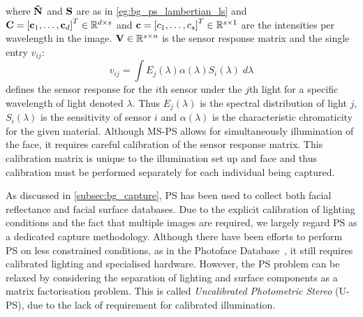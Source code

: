 where $\boldsymbol{\mathbf{\tilde{N}}}$ and $\boldsymbol{\mathbf{S}}$ are as in \cref{eg:bg_ps_lambertian_ls}
and $\boldsymbol{\mathbf{C}} = {[\boldsymbol{\mathbf{c}}_1, \ldots, \boldsymbol{\mathbf{c}}_d]}^T \in \mathbb{R}^{d \times s}$ and 
$\boldsymbol{\mathbf{c}} = {[c_1, \ldots, c_s]}^T \in \mathbb{R}^{s \times 1}$ are the intensities 
per wavelength in the image. $\boldsymbol{\mathbf{V}} \in \mathbb{R}^{s \times n}$ is the sensor 
response matrix and the single entry $v_{ij}$:
\begin{equation}\label{eg:bg_ps_sensor_response}
	v_{ij} = \int E_j(\lambda) \alpha(\lambda) S_i(\lambda) \; d\lambda
\end{equation}
defines the sensor response for the $i$th sensor under the $j$th light for
a specific wavelength of light denoted $\lambda$. Thus $E_j(\lambda)$ is the
spectral distribution of light $j$, $S_i(\lambda)$ is the sensitivity
of sensor $i$ and $\alpha(\lambda)$ is the characteristic chromaticity for the 
given material. Although MS-PS allows for simultaneously illumination of the
face, it requires careful calibration of the sensor response matrix. This
calibration matrix is unique to the illumination set up and face and thus 
calibration must be performed separately for each individual
being captured.

As discussed in \cref{subsec:bg_capture}, PS has been used to collect both
facial reflectance and facial surface databases. Due to the explicit
calibration of lighting conditions and the fact that multiple images are 
required, we largely regard PS as a dedicated capture methodology. Although
there have been efforts to perform PS on less constrained conditions, as in
the Photoface Database~\cite{RefWorks:293}, it still requires calibrated 
lighting and specialised hardware. However, the PS problem can be relaxed by
considering the separation of lighting and surface components as a matrix
factorisation problem. This is called 
\textit{Uncalibrated Photometric Stereo} (U-PS), due to the lack of
requirement for calibrated illumination.
